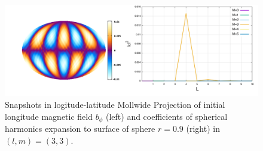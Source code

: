 \documentclass[12pt]{jsarticle}
\begin{document}
\begin{figure}[H]
\centering
\includegraphics[height=1.0\textheight,width=1.0\hsize,angle=0,keepaspectratio]{./Image/b0p_L3M3.png}
\caption{Snapshots in logitude-latitude Mollwide Projection of initial longitude magnetic field $b_\phi$ (left) and coefficients of spherical harmonics expansion to surface of sphere $r=0.9$ (right) in $(l,m)=(3,3)$.  }\label{b0p_L3M3}
\end{figure}


\end{document}
